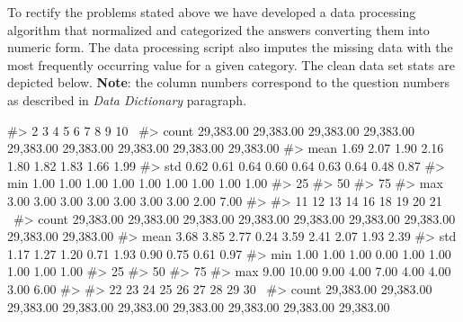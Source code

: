 To rectify the problems stated above we have developed a data processing
algorithm that normalized and categorized the answers converting them
into numeric form. The data processing script also imputes the missing
data with the most frequently occurring value for a given category. The
clean data set stats are depicted below. \textbf{Note}: the column
numbers correspond to the question numbers as described in \emph{Data
Dictionary} paragraph.

\begin{Schunk}
\begin{Soutput}
#>               2         3         4         5         6         7         8         9        10  \
#> count 29,383.00 29,383.00 29,383.00 29,383.00 29,383.00 29,383.00 29,383.00 29,383.00 29,383.00   
#> mean       1.69      2.07      1.90      2.16      1.80      1.82      1.83      1.66      1.99   
#> std        0.62      0.61      0.64      0.60      0.64      0.63      0.64      0.48      0.87   
#> min        1.00      1.00      1.00      1.00      1.00      1.00      1.00      1.00      1.00   
#> 25%
#> 50%
#> 75%
#> max        3.00      3.00      3.00      3.00      3.00      3.00      3.00      2.00      7.00   
#> 
#>              11        12        13        14        16        18        19        20        21  \
#> count 29,383.00 29,383.00 29,383.00 29,383.00 29,383.00 29,383.00 29,383.00 29,383.00 29,383.00   
#> mean       3.68      3.85      2.77      0.24      3.59      2.41      2.07      1.93      2.39   
#> std        1.17      1.27      1.20      0.71      1.93      0.90      0.75      0.61      0.97   
#> min        1.00      1.00      1.00      0.00      1.00      1.00      1.00      1.00      1.00   
#> 25%
#> 50%
#> 75%
#> max        9.00     10.00      9.00      4.00      7.00      4.00      4.00      3.00      6.00   
#> 
#>              22        23        24        25        26        27        28        29        30  \
#> count 29,383.00 29,383.00 29,383.00 29,383.00 29,383.00 29,383.00 29,383.00 29,383.00 29,383.00   

\end{Soutput}
\end{Schunk}
